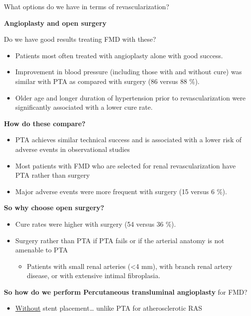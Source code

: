 \documentclass[
]{book}
\providecommand{\tightlist}{%
  \setlength{\itemsep}{0pt}\setlength{\parskip}{0pt}}
\begin{document}
What options do we have in terms of revascularization?

\textbf{Angioplasty and open surgery}

Do we have good results treating FMD with these?

\begin{itemize}
\item
  Patients most often treated with angioplasty alone with good
  success. \citep{daviesLongtermOutcomesPercutaneous2008, jenkinsOutcomesHypertensivePatients2015}
\item
  Improvement in blood pressure (including those with and without
  cure) was similar with PTA as compared with surgery (86 versus 88
  \%).
\item
  Older age and longer duration of hypertension prior to
  revascularization were significantly associated with a lower cure
  rate.
\end{itemize}

\textbf{How do these compare?}

\begin{itemize}
\item
  PTA achieves similar technical success and is associated with a
  lower risk of adverse events in observational studies
\item
  Most patients with FMD who are selected for renal revascularization
  have PTA rather than surgery
\item
  Major adverse events were more frequent with surgery (15 versus 6
  \%).
\end{itemize}

\textbf{So why choose open surgery?}

\begin{itemize}
\item
  Cure rates were higher with surgery (54 versus 36 \%).
\item
  Surgery rather than PTA if PTA fails or if the arterial anatomy is
  not amenable to PTA

  \begin{itemize}
  \tightlist
  \item
    Patients with small renal arteries (\textless4 mm), with branch renal
    artery disease, or with extensive intimal fibroplasia.
  \end{itemize}
\end{itemize}

\textbf{So how do we perform Percutaneous transluminal angioplasty} for FMD?

\begin{itemize}
\tightlist
\item
  \uline{Without} stent placement\ldots{} unlike PTA for
  atherosclerotic RAS
\end{itemize}
\end{document}
